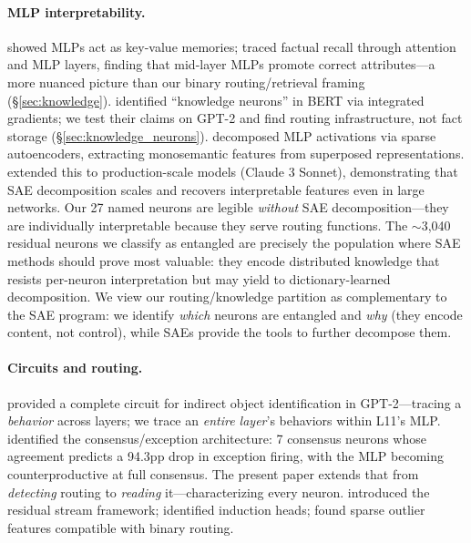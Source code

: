 \documentclass{article}
\begin{document}
\paragraph{MLP interpretability.}
\citet{geva2021transformer} showed MLPs act as key-value memories;
\citet{geva2023dissecting} traced factual recall through attention and MLP
layers, finding that mid-layer MLPs promote correct attributes---a more nuanced
picture than our binary routing/retrieval framing (\S\ref{sec:knowledge}).
\citet{dai2022knowledge} identified ``knowledge neurons'' in BERT via integrated
gradients; we test their claims on GPT-2 and find routing infrastructure,
not fact storage (\S\ref{sec:knowledge_neurons}).
\citet{bricken2023monosemanticity} decomposed MLP activations via sparse
autoencoders, extracting monosemantic features from superposed representations.
\citet{templeton2024scaling} extended this to production-scale models (Claude 3
Sonnet), demonstrating that SAE decomposition scales and recovers interpretable
features even in large networks.
Our 27 named neurons are legible \emph{without} SAE decomposition---they are
individually interpretable because they serve routing functions.
The $\sim$3{,}040 residual neurons we classify as entangled are precisely the
population where SAE methods should prove most valuable: they encode distributed
knowledge that resists per-neuron interpretation but may yield to
dictionary-learned decomposition.
We view our routing/knowledge partition as complementary to the SAE program:
we identify \emph{which} neurons are entangled and \emph{why} (they encode
content, not control), while SAEs provide the tools to further decompose them.

\paragraph{Circuits and routing.}
\citet{wang2023interpretability} provided a complete circuit for indirect object
identification in GPT-2---tracing a \emph{behavior} across layers; we trace
an \emph{entire layer}'s behaviors within L11's MLP.
\citet{balogh2026discrete} identified the consensus/exception architecture:
7 consensus neurons whose agreement predicts a 94.3pp drop in exception
firing, with the MLP becoming counterproductive at full consensus.
The present paper extends that from \emph{detecting} routing to \emph{reading}
it---characterizing every neuron.
\citet{elhage2021mathematical} introduced the residual stream framework;
\citet{olsson2022context} identified induction heads;
\citet{dettmers2022llm} found sparse outlier features compatible with
binary routing.
\end{document}

